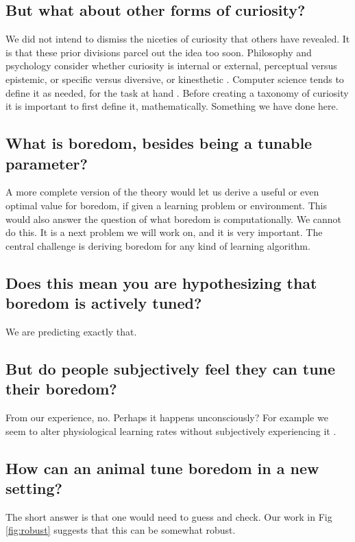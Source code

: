 \subsection*{But what about other forms of curiosity?}
We did not intend to dismiss the niceties of curiosity that others have revealed. It is that these prior divisions parcel out the idea too soon. Philosophy and psychology consider whether curiosity is internal or external, perceptual versus epistemic, or specific versus diversive, or kinesthetic \citep{Kidd2015,Berlyne1950,Zhou2020}. Computer science tends to define it as needed, for the task at hand \citep{Stanley2004,Friston2016,Lehman2011a,Lehman2013,Mouret2015,Colas2020}. Before creating a taxonomy of curiosity it is important to first define it, mathematically. Something we have done here.


\subsection*{What is boredom, besides being a tunable parameter?}
A more complete version of the theory would let us derive a useful or even optimal value for boredom, if given a learning problem or environment. This would also answer the question of what boredom is computationally. We cannot do this. It is a next problem we will work on, and it is very important. The central challenge is deriving boredom for any kind of learning algorithm.


\subsection*{Does this mean you are hypothesizing that boredom is actively tuned?}
We are predicting exactly that.


\subsection*{But do people subjectively feel they can tune their boredom?}
From our experience, no. Perhaps it happens unconsciously? For example we seem to alter physiological learning rates without subjectively experiencing it \citep{Behrens2007}.


\subsection*{How can an animal tune boredom in a new setting?}
The short answer is that one would need to guess and check. Our work in Fig \ref{fig:robust} suggests that this can be somewhat robust.


